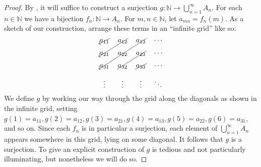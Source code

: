 \documentclass[12pt]{article}
\theoremstyle{definition}
\begin{document}
\begin{proof}
    By , it will suffice to construct a surjection \( g : \mathbb{N} \to \bigcup_{n=1}^{\infty} A_n \). For each \( n \in \mathbb{N} \) we have a bijection \( f_n : \mathbb{N} \to A_n \). For \( m, n \in \mathbb{N} \), let \( a_{mn} = f_n(m) \). As a sketch of our construction, arrange these terms in an ``infinite grid'' like so:
    \[
        \begin{tikzpicture}
            \matrix[matrix of math nodes,inner sep=1pt,row sep=1em,column sep=1em] (M)
            {
                a_{11} & a_{12} & a_{13} & \cdots \\
                a_{21} & a_{22} & a_{23} & \cdots \\
                a_{31} & a_{32} & a_{33} & \cdots \\
                \vdots & \vdots & \vdots & \ddots \\
            }
            ;
            \draw[->] (M-1-1.north east) -- (M-1-1.south west);
            \draw[->] (M-1-2.north east) -- (M-2-1.south west);
            \draw[->] (M-1-3.north east) -- (M-3-1.south west);
            \draw[-] (M-2-3.north east) -- (M-3-2.south west);
            \draw[-] (M-3-3.north east) -- (M-3-3.south west);
        \end{tikzpicture}
    \]
    We define \( g \) by working our way through the grid along the diagonals as shown in the infinite grid, setting \( g(1) = a_{11}, g(2) = a_{12}, g(3) = a_{21}, g(4) = a_{13}, g(5) = a_{22}, g(6) = a_{31} \), and so on. Since each \( f_n \) is in particular a surjection, each element of \( \bigcup_{n=1}^{\infty} A_n \) appears somewhere in this grid, lying on some diagonal. It follows that \( g \) is a surjection. To give an explicit construction of \( g \) is tedious and not particularly illuminating, but nonetheless we will do so.

    \vspace{2mm}


\end{proof}
\end{document}

